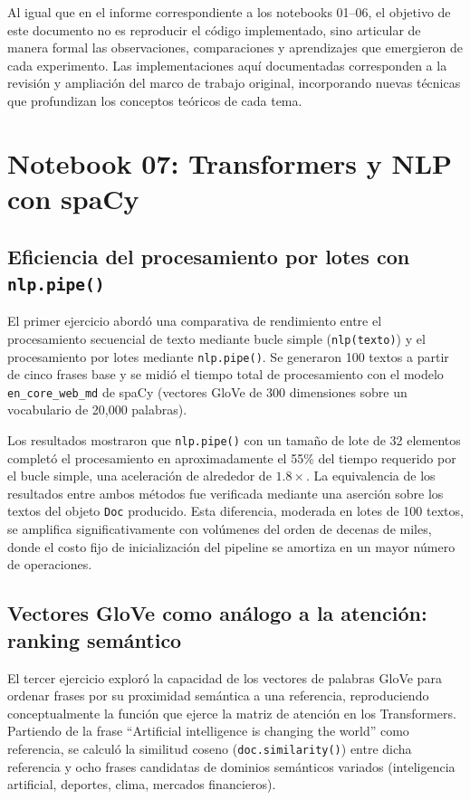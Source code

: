 \documentclass[12pt, a4paper]{article}
\begin{document}
Al igual que en el informe correspondiente a los notebooks 01--06, el objetivo de este documento no es reproducir el código implementado, sino articular de manera formal las observaciones, comparaciones y aprendizajes que emergieron de cada experimento. Las implementaciones aquí documentadas corresponden a la revisión y ampliación del marco de trabajo original, incorporando nuevas técnicas que profundizan los conceptos teóricos de cada tema.

\section{Notebook 07: Transformers y NLP con spaCy}

\subsection{Eficiencia del procesamiento por lotes con \texttt{nlp.pipe()}}

El primer ejercicio abordó una comparativa de rendimiento entre el procesamiento secuencial de texto mediante bucle simple (\texttt{nlp(texto)}) y el procesamiento por lotes mediante \texttt{nlp.pipe()}. Se generaron 100 textos a partir de cinco frases base y se midió el tiempo total de procesamiento con el modelo \texttt{en\_core\_web\_md} de spaCy (vectores GloVe de 300 dimensiones sobre un vocabulario de 20,000 palabras).

Los resultados mostraron que \texttt{nlp.pipe()} con un tamaño de lote de 32 elementos completó el procesamiento en aproximadamente el 55\% del tiempo requerido por el bucle simple, una aceleración de alrededor de $1.8\times$. La equivalencia de los resultados entre ambos métodos fue verificada mediante una aserción sobre los textos del objeto \texttt{Doc} producido. Esta diferencia, moderada en lotes de 100 textos, se amplifica significativamente con volúmenes del orden de decenas de miles, donde el costo fijo de inicialización del pipeline se amortiza en un mayor número de operaciones.

\subsection{Vectores GloVe como análogo a la atención: ranking semántico}

El tercer ejercicio exploró la capacidad de los vectores de palabras GloVe para ordenar frases por su proximidad semántica a una referencia, reproduciendo conceptualmente la función que ejerce la matriz de atención en los Transformers. Partiendo de la frase ``Artificial intelligence is changing the world'' como referencia, se calculó la similitud coseno (\texttt{doc.similarity()}) entre dicha referencia y ocho frases candidatas de dominios semánticos variados (inteligencia artificial, deportes, clima, mercados financieros).
\end{document}
